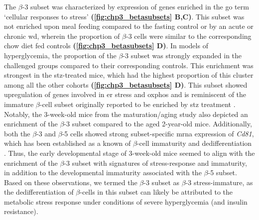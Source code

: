 \par The $\beta$-3 subset was characterized by expression of genes enriched in the \gls{go} term `cellular responses to stress' \textbf{(\autoref{fig:chp3_betasubsets} B,C)}. This subset was not enriched upon meal feeding compared to the fasting control or by an acute or chronic \gls{wd}, wherein the proportion of $\beta$-3 cells were similar to the corresponding chow diet fed controls \textbf{(\autoref{fig:chp3_betasubsets} D)}. In models of hyperglycemia, the proportion of the $\beta$-3 subset was strongly expanded in the challenged groups compared to their corresponding controls. This enrichment was strongest in the \gls{stz}-treated mice, which had the highest proportion of this cluster among all the other cohorts \textbf{(\ref{fig:chp3_betasubsets} D)}. This subset showed upregulation of genes involved in \gls{er} stress and \gls{oxphos} and is reminiscent of the immature $\beta$-cell subset originally reported to be enriched by \gls{stz} treatment \textbf{\cite{sachs_targeted_2020}}. Notably, the 3-week-old mice from the maturation/aging study also depicted an enrichment of the $\beta$-3 subset compared to the aged 2-year-old mice. Additionally, both the $\beta$-3 and $\beta$-5 cells showed strong subset-specific \gls{mrna} expression of \textit{Cd81}, which has been established as a known of $\beta$-cell immaturity and dedifferentiation \textbf{\cite{salinno_cd81_2021}}. Thus, the early developmental stage of 3-week-old mice seemed to align with the enrichment of the $\beta$-3 subset with signatures of stress-response and immaturity, in addition to the developmental immaturity associated with the $\beta$-5 subset. 
Based on these observations, we termed the $\beta$-3 subset as $\beta$-3 stress-immature, as the dedifferentiation of $\beta$-cells in this subset can likely be attributed to the metabolic stress response under conditions of severe hyperglycemia (and insulin resistance).\\


